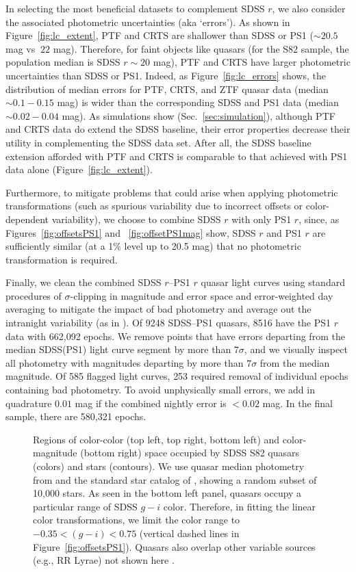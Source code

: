 \documentclass[twocolumn]{aastex62}
\begin{document}
In selecting the most beneficial datasets to complement SDSS $r$, we also consider the associated photometric uncertainties (aka `errors'). As shown in Figure~\ref{fig:lc_extent},  PTF and CRTS are shallower than SDSS or PS1 ($\sim20.5$ mag vs $~22$ mag). Therefore, for faint objects like quasars (for the S82 sample, the population median is SDSS $r{\sim}20$ mag), PTF and CRTS have larger photometric uncertainties than SDSS or PS1. Indeed, as Figure~\ref{fig:lc_errors} shows, the distribution of median errors for PTF, CRTS, and ZTF quasar data (median $\sim0.1-0.15$ mag) is wider than the corresponding SDSS and PS1 data (median ${\sim}0.02-0.04$ mag). As simulations show (Sec.~\ref{sec:simulation}), although PTF and CRTS data do extend the SDSS baseline, their error properties decrease their utility in complementing the SDSS data set. After all, the SDSS baseline extension afforded with PTF and CRTS is comparable to that achieved with PS1 data alone (Figure~\ref{fig:lc_extent}). 

Furthermore, to mitigate problems that could arise when applying photometric transformations (such as spurious variability due to incorrect offsets or color-dependent variability), we choose to combine SDSS $r$ with only PS1 $r$, since, as Figures~\ref{fig:offsetsPS1} and ~\ref{fig:offsetPS1mag} show, SDSS $r$ and PS1 $r$ are sufficiently similar (at a 1\% level up to 20.5 mag) that no photometric transformation is required. 

Finally, we clean the combined SDSS $r$--PS1 $r$ quasar light curves using standard procedures of  $\sigma$-clipping in magnitude and error space and error-weighted day averaging to mitigate the impact of bad photometry and average out the intranight variability (as in \citealt{charisi2016,suberlak2017}). Of 9248 SDSS--PS1 quasars, 8516 have the PS1 $r$ data with 662,092 epochs.  We remove points that have errors departing from the median SDSS(PS1) light curve segment by more than $7 \sigma$, and we visually inspect all photometry with magnitudes departing by more than  $7\sigma$ from the median magnitude. Of 585 flagged light curves, 253 required removal of individual epochs containing bad photometry. To avoid unphysically small errors,  we add in quadrature $0.01$ mag if the combined nightly error is $<0.02$ mag. In the final sample, there are 580,321 epochs. 


\begin{figure*} 
	\caption{Regions of color-color (top left, top right, bottom left) and color-magnitude (bottom right)  space occupied by SDSS S82 quasars (colors) and stars (contours). We use quasar median photometry from \citet{schneider2010} and the standard star catalog of \citet{ivezic2007}, showing a random subset of 10,000 stars. As seen in the bottom left panel, quasars occupy a particular range of SDSS $g-i$ color. Therefore, in fitting the linear color transformations, we limit the color range to $-0.35<(g-i)<0.75$ (vertical dashed lines in Figure~\ref{fig:offsetsPS1}). Quasars also overlap other variable sources (e.g., RR Lyrae) not shown here \citep{sesar2007}. }
	\label{fig:quasarColors}
\end{figure*} 
\end{document}
